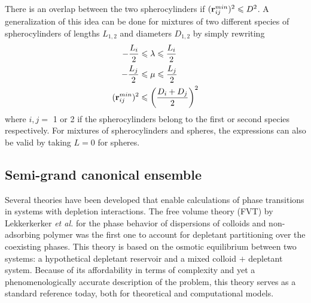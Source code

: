 There is an overlap between the two spherocylinders if $({\bf r}_{ij}^{min})^2 \leqslant D^2$. A generalization of this idea can be done for mixtures of two different species of spherocylinders of lengths $L_{1,2}$ and diameters $D_{1,2}$ by simply rewriting
\begin{align}
-\frac{L_i}{2}& \leqslant \lambda \leqslant \frac{L_i}{2} \nonumber \\
-\frac{L_j}{2}& \leqslant \mu \leqslant \frac{L_j}{2} \nonumber \\
    ({\bf r}_{ij}^{min})^2& \leqslant \left( \frac{D_i+D_j}{2}\right)^2
\end{align}
where $i,j=$ 1 or 2 if the spherocylinders belong to the first or second species respectively. For mixtures of spherocylinders and spheres, the expressions can also be valid by taking $L=0$ for spheres.

\subsection{Semi-grand canonical ensemble}

Several theories have been developed that enable calculations of phase transitions in systems with depletion interactions. The free volume theory (FVT) by Lekkerkerker {\em et al.} \cite{sphere+polymer} for the phase behavior of dispersions of colloids and non-adsorbing polymer was the first one to account for depletant partitioning over the coexisting phases. This theory is based on the osmotic equilibrium between two systems: a hypothetical depletant reservoir and a mixed colloid $+$ depletant system. Because of its affordability in terms of complexity and yet a phenomenologically accurate description of the problem, this theory serves as a standard reference today, both for theoretical and computational models.

